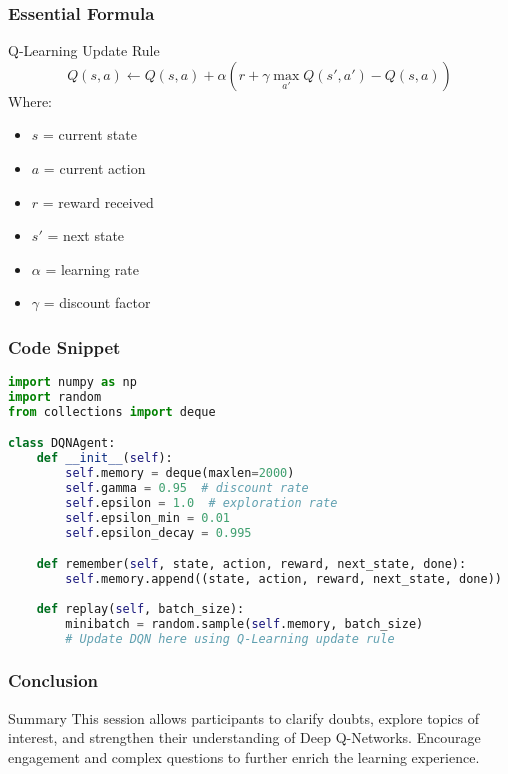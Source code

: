 \documentclass[aspectratio=169]{beamer}
\begin{document}
\begin{frame}[fragile]
    \frametitle{Essential Formula}
    \begin{block}{Q-Learning Update Rule}
        \begin{equation}
        Q(s, a) \leftarrow Q(s, a) + \alpha \left( r + \gamma \max_{a'} Q(s', a') - Q(s, a) \right)
        \end{equation}
        Where:
        \begin{itemize}
            \item $s$ = current state
            \item $a$ = current action
            \item $r$ = reward received
            \item $s'$ = next state
            \item $\alpha$ = learning rate
            \item $\gamma$ = discount factor
        \end{itemize}
    \end{block}
\end{frame}

\begin{frame}[fragile]
    \frametitle{Code Snippet}
    \begin{lstlisting}[language=Python]
import numpy as np
import random
from collections import deque

class DQNAgent:
    def __init__(self):
        self.memory = deque(maxlen=2000)
        self.gamma = 0.95  # discount rate
        self.epsilon = 1.0  # exploration rate
        self.epsilon_min = 0.01
        self.epsilon_decay = 0.995

    def remember(self, state, action, reward, next_state, done):
        self.memory.append((state, action, reward, next_state, done))
    
    def replay(self, batch_size):
        minibatch = random.sample(self.memory, batch_size)
        # Update DQN here using Q-Learning update rule
    \end{lstlisting}
\end{frame}

\begin{frame}[fragile]
    \frametitle{Conclusion}
    \begin{block}{Summary}
        This session allows participants to clarify doubts, explore topics of interest, and strengthen their understanding of Deep Q-Networks. Encourage engagement and complex questions to further enrich the learning experience.
    \end{block}
\end{frame}
\end{document}

